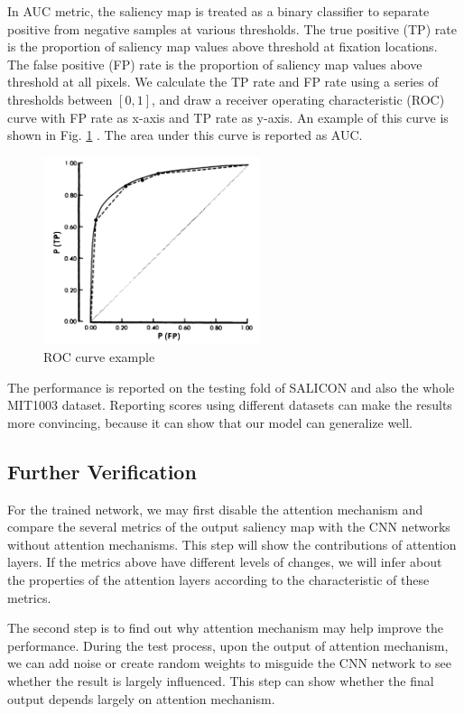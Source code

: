 \documentclass[12pt]{article}
\begin{document}
In AUC metric,
the saliency map is treated as a binary classifier to separate positive from negative samples at various thresholds. 
The true positive (TP) rate is the proportion of saliency map values above threshold at fixation locations. 
The false positive (FP) rate is the proportion of saliency map values above threshold at all pixels. 
We calculate the TP rate and FP rate using a series of thresholds between $[0, 1]$, and draw a
receiver operating characteristic (ROC) curve with FP rate as x-axis and TP rate as y-axis.
An example of this curve is shown in Fig. \ref{img:AUC} \cite{hanleyMeaningUseArea1982}.
The area under this curve is reported as AUC.
\begin{figure}[!h]
    \centering
    \includegraphics[width=2.5in]{imgs/AUC.png}
    \caption{ROC curve example}
    \label{img:AUC}
\end{figure}


The performance is reported on the testing fold of SALICON and also the whole MIT1003 dataset.
Reporting scores using different datasets can make the results more convincing,
because it can show that our model can generalize well.
\subsection{Further Verification}

For the trained network, we may first disable the attention mechanism and compare the several metrics of the output saliency map with the CNN networks without attention mechanisms.
This step will show the contributions of attention layers. If the metrics above have different levels of changes, we will infer about the properties of the attention layers according to the characteristic of these metrics.

The second step is to find out why attention mechanism may help improve the performance. 
During the test process, upon the output of attention mechanism, we can add noise or create random weights to misguide the CNN network to see whether the result is largely influenced.
This step can show whether the final output depends largely on attention mechanism.
\end{document}
